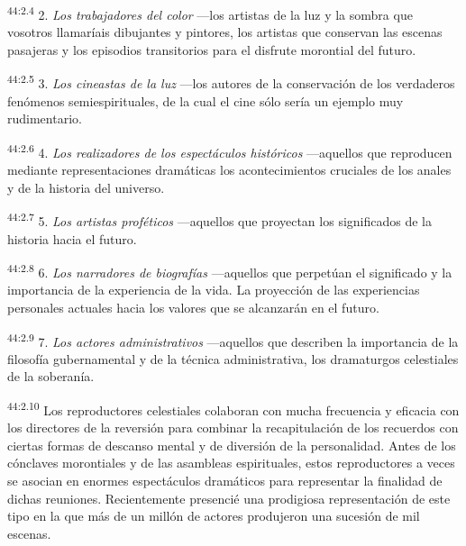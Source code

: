 \par
\textsuperscript{44:2.4} 2. \textit{Los trabajadores del color} ---los artistas de la luz y la sombra que vosotros llamaríais dibujantes y pintores, los artistas que conservan las escenas pasajeras y los episodios transitorios para el disfrute morontial del futuro.

\par
\textsuperscript{44:2.5} 3. \textit{Los cineastas de la luz} ---los autores de la conservación de los verdaderos fenómenos semiespirituales, de la cual el cine sólo sería un ejemplo muy rudimentario.

\par
\textsuperscript{44:2.6} 4. \textit{Los realizadores de los espectáculos históricos} ---aquellos que reproducen mediante representaciones dramáticas los acontecimientos cruciales de los anales y de la historia del universo.

\par
\textsuperscript{44:2.7} 5. \textit{Los artistas proféticos} ---aquellos que proyectan los significados de la historia hacia el futuro.

\par
\textsuperscript{44:2.8} 6. \textit{Los narradores de biografías} ---aquellos que perpetúan el significado y la importancia de la experiencia de la vida. La proyección de las experiencias personales actuales hacia los valores que se alcanzarán en el futuro.

\par
\textsuperscript{44:2.9} 7. \textit{Los actores administrativos} ---aquellos que describen la importancia de la filosofía gubernamental y de la técnica administrativa, los dramaturgos celestiales de la soberanía.

\par
\textsuperscript{44:2.10} Los reproductores celestiales colaboran con mucha frecuencia y eficacia con los directores de la reversión para combinar la recapitulación de los recuerdos con ciertas formas de descanso mental y de diversión de la personalidad. Antes de los cónclaves morontiales y de las asambleas espirituales, estos reproductores a veces se asocian en enormes espectáculos dramáticos para representar la finalidad de dichas reuniones. Recientemente presencié una prodigiosa representación de este tipo en la que más de un millón de actores produjeron una sucesión de mil escenas.

